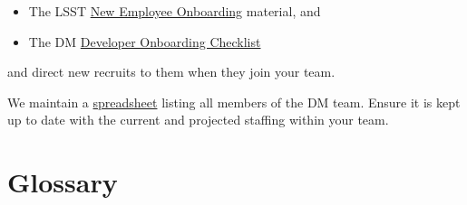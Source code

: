 \begin{itemize}
\item
  The LSST \href{https://project.lsst.org/onboarding}{New Employee
  Onboarding} material, and
\item
  The DM
  \href{https://developer.lsst.io/getting-started/onboarding.html}{Developer
  Onboarding Checklist}
\end{itemize}

and direct new recruits to them when they join your team.

We maintain a
\href{https://docs.google.com/spreadsheets/d/1G9KXBJJHfWkVDQeApfXaN_nZjD_YUJlHiEDOzhTy-0c/edit?usp=drive_web}{spreadsheet}
listing all members of the DM team. Ensure it is kept up to date with
the current and projected staffing within your team.

\section{Glossary}\label{glossary}
